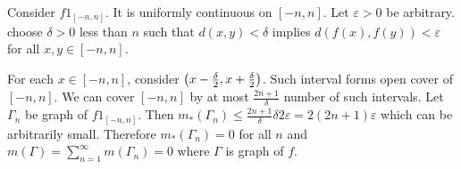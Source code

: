 \begin{problem}[1.37]\hfill

	Consider $f 1_{\left[ -n, n \right]}$. It is uniformly continuous on $[-n, n]$. Let $\varepsilon>0$ be arbitrary. choose $\delta>0$ less than $n$ such that $d(x, y) < \delta$ implies $d(f(x), f(y)) < \varepsilon$ for all $x, y \in \left[ -n, n \right]$. 

	For each $x \in \left[ -n, n \right]$, consider $\left( x- {\delta \over 2}, x+ \frac{\delta}{2} \right)$. Such interval forms open cover of $[-n, n]$.
	We can cover $\left[ -n, n \right]$ by at most $\frac{2n+1}{\delta}$ number of such intervals.
	Let $\Gamma_n$ be graph of $f 1_{\left[ -n, n \right]}$.
	Then $m_*(\Gamma_n) \leq \frac{2n+1}{\delta} \delta 2\varepsilon = 2(2n+1)\varepsilon$ which can be arbitrarily small. Therefore $m_*(\Gamma_n) = 0$ for all $n$ and $m(\Gamma) = \sum_{n=1}^\infty m(\Gamma_n) = 0$ where $\Gamma$ is graph of $f$.
	
\end{problem}


